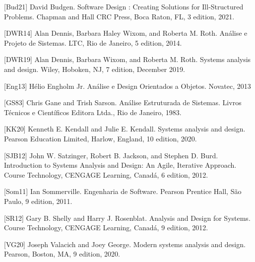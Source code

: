 \documentclass[11pt,fleqn]{book} %
\begin{document}


[Bud21] David Budgen. Software Design : Creating Solutions for Ill-Structured Problems. Chapman and Hall CRC Press, Boca Raton, FL, 3 edition, 2021.

[DWR14] Alan Dennis, Barbara Haley Wixom, and Roberta M. Roth. Análise e Projeto de
Sistemas. LTC, Rio de Janeiro, 5 edition, 2014.

[DWR19] Alan Dennis, Barbara Wixom, and Roberta M. Roth. Systems analysis and design.
Wiley, Hoboken, NJ, 7 edition, December 2019. 

[Eng13] Hélio Engholm Jr. Análise e Design Orientados a Objetos. Novatec, 2013

[GS83] Chris Gane and Trish Sarson. Análise Estruturada de Sistemas. Livros Técnicos e
Científicos Editora Ltda., Rio de Janeiro, 1983.

[KK20] Kenneth E. Kendall and Julie E. Kendall. Systems analysis and design. Pearson Education
Limited, Harlow, England, 10 edition, 2020. 

[SJB12] John W. Satzinger, Robert B. Jackson, and Stephen D. Burd. Introduction to Systems
Analysis and Design: An Agile, Iterative Approach. Course Technology, CENGAGE
Learning, Canadá, 6 edition, 2012. 

[Som11] Ian Sommerville. Engenharia de Software. Pearson Prentice Hall, São Paulo, 9 edition,
2011.

[SR12] Gary B. Shelly and Harry J. Rosenblat. Analysis and Design for Systems. Course
Technology, CENGAGE Learning, Canadá, 9 edition, 2012.

[VG20] Joseph Valacich and Joey George. Modern systems analysis and design. Pearson, Boston,
MA, 9 edition, 2020. 
\end{document}
